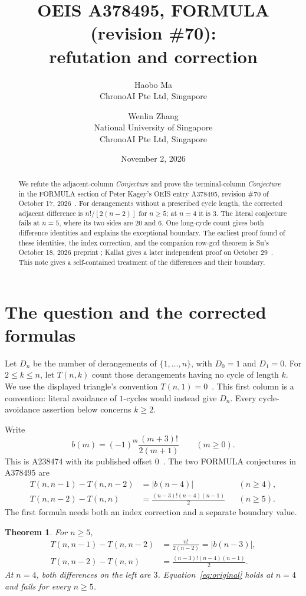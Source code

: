 \documentclass[11pt]{article}
\title{OEIS A378495, FORMULA (revision \#70):\\refutation and correction}
\author{Haobo Ma\\\small ChronoAI Pte Ltd, Singapore
\and Wenlin Zhang\\\small National University of Singapore\\\small ChronoAI Pte Ltd, Singapore}
\date{November 2, 2026}
\newtheorem{theorem}{Theorem}
\newcommand{\Der}{D}
\begin{document}
\maketitle
\begin{abstract}
We refute the adjacent-column \emph{Conjecture} and prove the terminal-column
\emph{Conjecture} in the FORMULA section of Peter Kagey's OEIS entry A378495,
revision \#70 of October 17, 2026~\cite{triangle}.
For derangements without a prescribed cycle length, the corrected adjacent
difference is $n!/[2(n-2)]$ for $n\geq5$; at $n=4$ it is $3$.
The literal conjecture fails at $n=5$, where its two sides are $20$ and $6$.
One long-cycle count gives both difference identities and explains the exceptional
boundary. The earliest proof found of these identities, the index correction,
and the companion row-gcd theorem is Su's October 18, 2026 preprint
\cite[Theorem~7.3, Proposition~7.4, Remark~7.5]{su}; Kallat gives a later
independent proof on October 29~\cite[Theorem~4.1]{valuation}.
This note gives a self-contained treatment of the differences and their boundary.
\end{abstract}

\section{The question and the corrected formulas}

Let $\Der_n$ be the number of derangements of $\{1,\ldots,n\}$, with
$\Der_0=1$ and $\Der_1=0$. For $2\leq k\leq n$, let $T(n,k)$ count those
derangements having no cycle of length $k$. We use the displayed triangle's
convention $T(n,1)=0$~\cite{triangle}. This first column is a convention:
literal avoidance of $1$-cycles would instead give $\Der_n$.
Every cycle-avoidance assertion below concerns $k\geq2$.

Write
\begin{equation}\label{eq:b}
 b(m)=(-1)^m\frac{(m+3)!}{2(m+1)}\qquad(m\geq0).
\end{equation}
This is A238474 with its published offset $0$~\cite{bsequence}.
The two FORMULA conjectures in A378495 are
\begin{align}
 T(n,n-1)-T(n,n-2)&=|b(n-4)| &&(n\geq4),\label{eq:original}\\
 T(n,n-2)-T(n,n)&=\frac{(n-3)!(n-4)(n-1)}2 &&(n\geq5).
 \label{eq:terminal}
\end{align}
The first formula needs both an index correction and a separate boundary value.

\begin{theorem}\label{thm:main}
For $n\geq5$,
\begin{align}
 T(n,n-1)-T(n,n-2)
 &=\frac{n!}{2(n-2)}=|b(n-3)|,\label{eq:corrected}\\
 T(n,n-2)-T(n,n)
 &=\frac{(n-3)!(n-4)(n-1)}2.\label{eq:proved}
\end{align}
At $n=4$, both differences on the left are $3$.
Equation~\eqref{eq:original} holds at $n=4$ and fails for every $n\geq5$.
\end{theorem}
\end{document}
